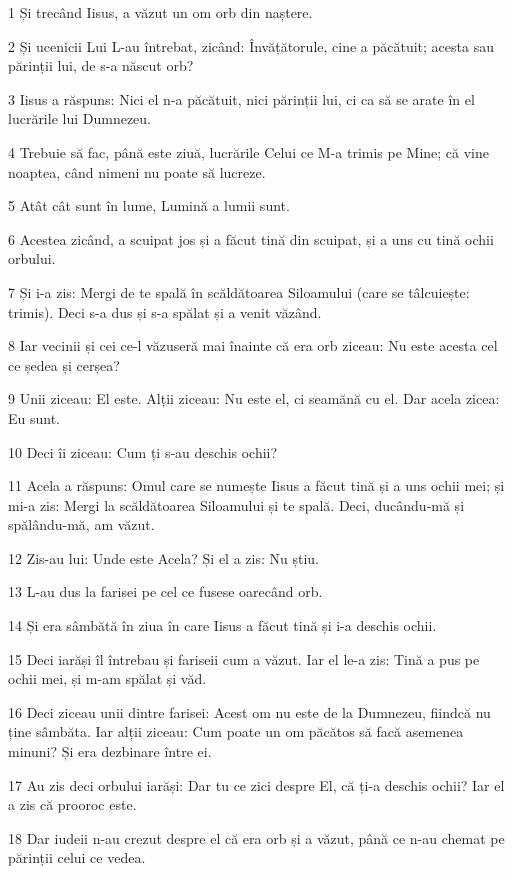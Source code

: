 \par 1 Și trecând Iisus, a văzut un om orb din naștere.
\par 2 Și ucenicii Lui L-au întrebat, zicând: Învățătorule, cine a păcătuit; acesta sau părinții lui, de s-a născut orb?
\par 3 Iisus a răspuns: Nici el n-a păcătuit, nici părinții lui, ci ca să se arate în el lucrările lui Dumnezeu.
\par 4 Trebuie să fac, până este ziuă, lucrările Celui ce M-a trimis pe Mine; că vine noaptea, când nimeni nu poate să lucreze.
\par 5 Atât cât sunt în lume, Lumină a lumii sunt.
\par 6 Acestea zicând, a scuipat jos și a făcut tină din scuipat, și a uns cu tină ochii orbului.
\par 7 Și i-a zis: Mergi de te spală în scăldătoarea Siloamului (care se tâlcuiește: trimis). Deci s-a dus și s-a spălat și a venit văzând.
\par 8 Iar vecinii și cei ce-l văzuseră mai înainte că era orb ziceau: Nu este acesta cel ce ședea și cerșea?
\par 9 Unii ziceau: El este. Alții ziceau: Nu este el, ci seamănă cu el. Dar acela zicea: Eu sunt.
\par 10 Deci îi ziceau: Cum ți s-au deschis ochii?
\par 11 Acela a răspuns: Omul care se numește Iisus a făcut tină și a uns ochii mei; și mi-a zis: Mergi la scăldătoarea Siloamului și te spală. Deci, ducându-mă și spălându-mă, am văzut.
\par 12 Zis-au lui: Unde este Acela? Și el a zis: Nu știu.
\par 13 L-au dus la farisei pe cel ce fusese oarecând orb.
\par 14 Și era sâmbătă în ziua în care Iisus a făcut tină și i-a deschis ochii.
\par 15 Deci iarăși îl întrebau și fariseii cum a văzut. Iar el le-a zis: Tină a pus pe ochii mei, și m-am spălat și văd.
\par 16 Deci ziceau unii dintre farisei: Acest om nu este de la Dumnezeu, fiindcă nu ține sâmbăta. Iar alții ziceau: Cum poate un om păcătos să facă asemenea minuni? Și era dezbinare între ei.
\par 17 Au zis deci orbului iarăși: Dar tu ce zici despre El, că ți-a deschis ochii? Iar el a zis că prooroc este.
\par 18 Dar iudeii n-au crezut despre el că era orb și a văzut, până ce n-au chemat pe părinții celui ce vedea.
